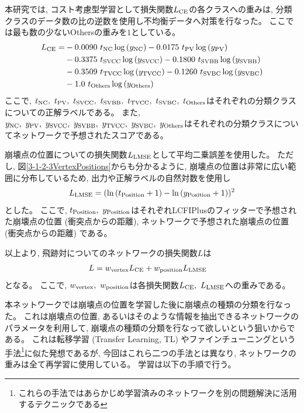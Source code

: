 本研究では, コスト考慮型学習として損失関数$L_{\rm CE}$の各クラスへの重みは, 分類クラスのデータ数の比の逆数を使用し不均衡データへ対策を行なった。
ここでは最も数の少ないOthersの重みを$1$としている。
\begin{equation}
 \begin{split}
 L_{\rm CE} = & - 0.0090\  t_{\rm NC} \log{(y_{\rm NC})} - 0.0175\  t_{\rm PV} \log{(y_{\rm PV})} \\
       & - 0.3375\  t_{\rm SVCC} \log{(y_{\rm SVCC})} - 0.1800\  t_{\rm SVBB} \log{(y_{\rm SVBB})}\\
       & - 0.3509\  t_{\rm TVCC} \log{(y_{\rm TVCC})} - 0.1260\  t_{\rm SVBC} \log{(y_{\rm SVBC})}\\
       & - 1.0\  t_{\rm Others} \log{(y_{\rm Others})}\\
 \end{split}
\end{equation}
ここで, $t_{\rm NC},\ t_{\rm PV},\ t_{\rm SVCC},\ t_{\rm SVBB},\ t_{\rm TVCC},\ t_{\rm SVBC},\ t_{\rm Others}$はそれぞれの分類クラスについての正解ラベルである。
また, $y_{\rm NC},\ y_{\rm PV},\ y_{\rm SVCC},\ y_{\rm SVBB},\ y_{\rm TVCC},\ y_{\rm SVBC},\ y_{\rm Others}$はそれぞれの分類クラスについてネットワークで予想されたスコアである。

崩壊点の位置についての損失関数$L_{\rm LMSE}$として平均二乗誤差を使用した。
ただし, 図\ref{3-1-2-3VertexPositions}からも分かるように, 崩壊点の位置は非常に広い範囲に分布しているため, 出力や正解ラベルの自然対数を使用し
\begin{equation}
 \begin{split}
 L_{\rm LMSE} = (\ln{(t_{\rm Position}+1)} - \ln{(y_{\rm Position}+1)})^2
 \end{split}
\end{equation}
とした。
ここで, $t_{\rm Position},\ y_{\rm Position}$はそれぞれLCFIPlusのフィッターで予想された崩壊点の位置 (衝突点からの距離), ネットワークで予想された崩壊点の位置 (衝突点からの距離) である。

以上より, 飛跡対についてのネットワークの損失関数$L$は
\begin{equation}
 \begin{split}
 L & = w_{\rm vertex} L_{\rm CE} + w_{\rm position} L_{\rm LMSE}
 \end{split}
\end{equation}
となる。
ここで, $w_{\rm vertex},\ w_{\rm position}$は各損失関数$L_{\rm CE},\ L_{\rm LMSE}$への重みである。

本ネットワークでは崩壊点の位置を学習した後に崩壊点の種類の分類を行なった。
これは崩壊点の位置, あるいはそのような情報を抽出できるネットワークのパラメータを利用して, 崩壊点の種類の分類を行なって欲しいという狙いからである。
これは転移学習 (Transfer Learning, TL) やファインチューニングという手法\footnote{これらの手法ではあらかじめ学習済みのネットワークを別の問題解決に活用するテクニックである}に似た発想であるが, 今回はこれら二つの手法とは異なり, ネットワークの重みは全て再学習に使用している。
学習は以下の手順で行う。


